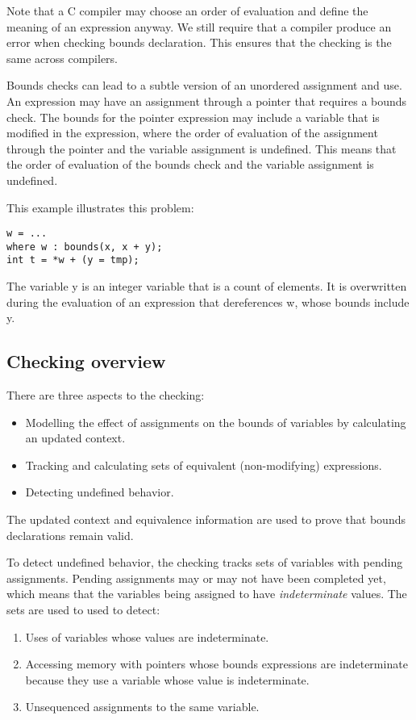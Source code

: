Note that a C compiler may choose an order of evaluation and
define the meaning of an expression anyway.  We still
require that a compiler produce an error when checking
bounds declaration.  This ensures that the checking
is the same across compilers.

Bounds checks can lead to a subtle version of an unordered assignment
and use.  An expression may have an assignment through a pointer that requires a
bounds check. The bounds for the pointer expression may include a
variable that is modified in the expression, where the order of
evaluation of the assignment through the pointer and the variable
assignment is undefined. This means that the order of evaluation of the
bounds check and the variable assignment is undefined.

This example illustrates this problem:

\begin{lstlisting}
w = ...
where w : bounds(x, x + y);
int t = *w + (y = tmp);
\end{lstlisting}

The variable y is an integer variable that is a count of elements. It is
overwritten during the evaluation of an expression that dereferences w,
whose bounds include y.

\subsection{Checking overview}
There are three aspects to the checking:
\begin{itemize}
\item Modelling the effect of assignments on the bounds
of variables by calculating an updated context.
\item Tracking and calculating sets of equivalent (non-modifying) expressions.
\item Detecting undefined behavior.
\end{itemize}
The updated context and equivalence information are used to prove that bounds
declarations remain valid. 

To detect undefined behavior, the checking tracks
sets of variables with pending assignments.  Pending
assignments may or may not have been completed yet, which means
that the variables being assigned to have {\em indeterminate}
values.  The sets are used to used to detect:
\begin{enumerate}
\item Uses of variables whose values are indeterminate.
\item Accessing memory with pointers whose bounds expressions
are indeterminate because they use a variable whose value is indeterminate.
\item Unsequenced assignments to the same variable.
\end{enumerate}

